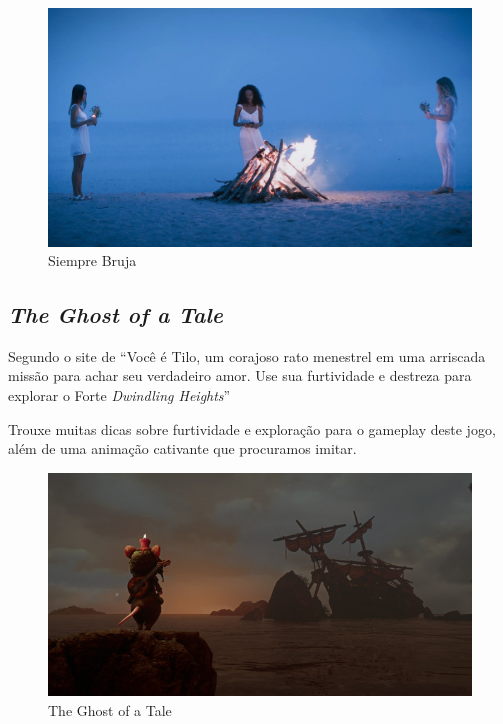 \begin{figure}[!htb] \caption{\label{siempre}Siempre Bruja} \begin{center}
\includegraphics[width=\textwidth]{imagens/SiempreBruja.jpg} \end{center}
 \end{figure}

\clearpage

\subsection{\textit{The Ghost of a Tale}} Segundo o site de   ``Você é Tilo,
um corajoso rato menestrel em uma arriscada missão para achar seu verdadeiro
amor. Use sua furtividade e destreza para explorar o Forte \textit{Dwindling
Heights}''

Trouxe muitas dicas sobre furtividade e exploração para o gameplay deste jogo, além de uma animação cativante que procuramos imitar.

\begin{figure}[!htb] \caption{\label{tale}The Ghost of a Tale} \begin{center}
\includegraphics[width=\textwidth]{imagens/tale.jpg} \end{center}
 \end{figure}

